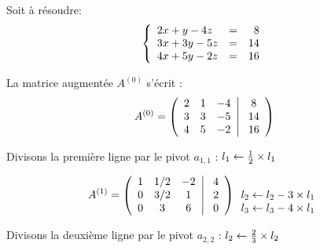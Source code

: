 \documentclass[a4paper, 10pt]{article}
\begin{document}
Soit à résoudre:
\[
\left \{
\begin{array}{l c r}
2x+y-4z & = & 8 \\
3x+3y-5z & = & 14 \\
4x+5y-2z & = & 16 \\
\end{array}
\right .
\]

La matrice augmentée $A^{(0)}$ s'écrit :
\begin{equation}
A^{(0)}=
\left(
\begin{array}{c c c c }
2  & 1   & -4  \\
3  & 3   & -5   \\
4  & 5  & -2  \\ 
\end{array}
\right|
\left.
\begin{array}{c}
8  \\ 14   \\ 16  \\ 
\end{array}
\right)
\end{equation}

Divisons la première ligne par le pivot $a_{1,1}$ :
$l_1 \leftarrow {1 \over 2} \times l_1$

\begin{equation}
A^{(1)}=
\left(
\begin{array}{c c c c }
1  & {1/2}   & -2  \\
0  &  {3/2}   & 1   \\
0  & 3  & 6  \\ 
\end{array}
\right|
\left.
\begin{array}{c}
4   \\ 2    \\ 0  \\ 
\end{array}
\right)
\begin{array}{c}
   \\ l_2 \leftarrow l_2 -3 \times l_1   \\ l_3 \leftarrow l_3 -4 \times l_1  \\ 
\end{array}
\end{equation}

Divisons la deuxième ligne par le pivot $a_{2, 2}$ :
$l_2 \leftarrow {2 \over 3} \times l_2$
\end{document}
